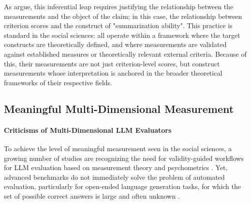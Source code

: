 As \citet{salaudeenMeasurementMeaningValidityCentered2025} argue, this inferential leap requires justifying the relationship between the measurements and the object of the claim; in this case, the relationship between criterion scores and the construct of "summarization ability". This practice is standard in the social sciences: \citet{boydLanguagebasedPersonalityNew2017, guntukuDetectingDepressionMental2017, kahnMeasuringEmotionalExpression2007, manelaNewsImpliedVolatility2017, gentzkowMeasuringGroupDifferences2019, rathjeGPTEffectiveTool2024, lemensUncoveringSemanticsConcepts2023, yangLLMMeasureGeneratingValid2024} all operate within a framework where the target constructs are theoretically defined, and where measurements are validated against established measures or theoretically relevant external criteria. Because of this, their measurements are not just criterion-level scores, but construct measurements whose interpretation is anchored in the broader theoretical frameworks of their respective fields.


\subsection{Meaningful Multi-Dimensional Measurement}\label{sec:litrev_meaning}

\paragraph{Criticisms of Multi-Dimensional LLM Evaluators}

To achieve the level of meaningful measurement seen in the social sciences, a growing number of studies are recognizing the need for validity-guided workflows for LLM evaluation based on measurement theory and psychometrics \citep{xiaoEvaluatingEvaluationMetrics2023, linPromptsConstructsDualValidity2025, binetteImprovingValidityPractical2024, beanMeasuringWhatMatters2025, salaudeenMeasurementMeaningValidityCentered2025, wangEvaluatingGeneralPurposeAI, kardanovaNovelPsychometricsBasedApproach2024, federiakinImprovingLLMLeaderboards2025, PDFModernLLM2026, feuerWhenJudgmentBecomes2025, alaaMedicalLargeLanguage2025}. Yet, advanced benchmarks do not immediately solve the problem of automated evaluation, particularly for open-ended language generation tasks, for which the set of possible correct answers is large and often unknown \citep{freitagExpertsErrorsContext2021}.

